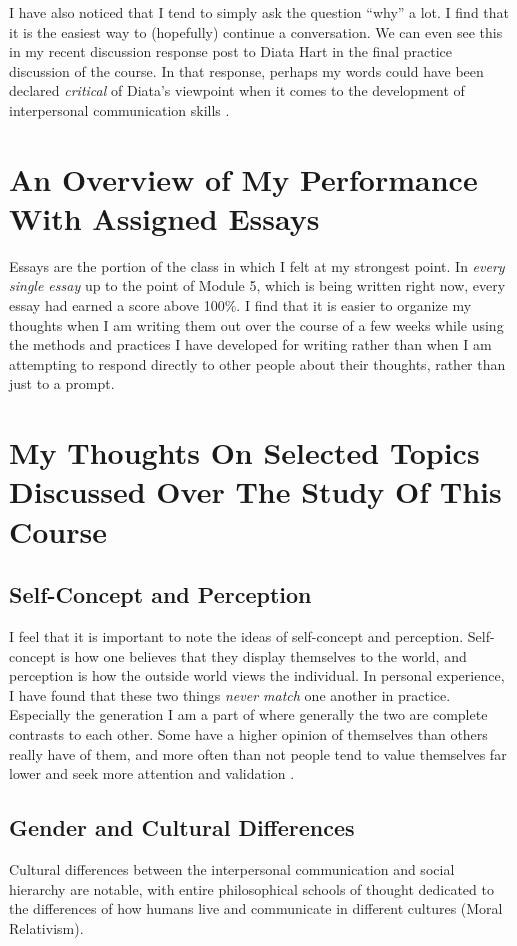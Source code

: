   I have also noticed that I tend to simply ask the question ``why'' a lot.
    I find that it is the easiest way to (hopefully) continue a conversation.
    We can even see this in my recent discussion response post to Diata Hart
    in the final practice discussion of the course. In that response, perhaps
    my words could have been declared \textit{critical} of Diata's viewpoint
    when it comes to the development of interpersonal communication skills
    \parencite{hellwig_diata_2020}.


\section{An Overview of My Performance With Assigned Essays}
  Essays are the portion of the class in which I felt at my strongest point.
    In \textit{every single essay} up to the point of Module 5, which is being
    written right now, every essay had earned a score above 100\%. I find that
    it is easier to organize my thoughts when I am writing them out over the
    course of a few weeks while using the methods and practices I have developed
    for writing rather than when I am attempting to respond directly to
    other people about their thoughts, rather than just to a prompt.


\section{My Thoughts On Selected Topics Discussed Over The Study Of This Course}
  \subsection{Self-Concept and Perception}
    I feel that it is important to note the ideas of self-concept and
      perception. Self-concept is how one believes that they display themselves
      to the world, and perception is how the outside world views the
      individual. In personal experience, I have found that these two things
      \textit{never match} one another in practice. Especially the generation
      I am a part of where generally the two are complete contrasts to each
      other. Some have a higher opinion of themselves than others really have of
      them, and more often than not people tend to value themselves far lower
      and seek more attention and validation
      \parencite[pp. 586]{stewart_comparing_2010}.

  \subsection{Gender and Cultural Differences}
    Cultural differences between the interpersonal communication and social
      hierarchy are notable, with entire philosophical schools of thought
      dedicated to the differences of how humans live and communicate in
      different cultures (Moral Relativism).

